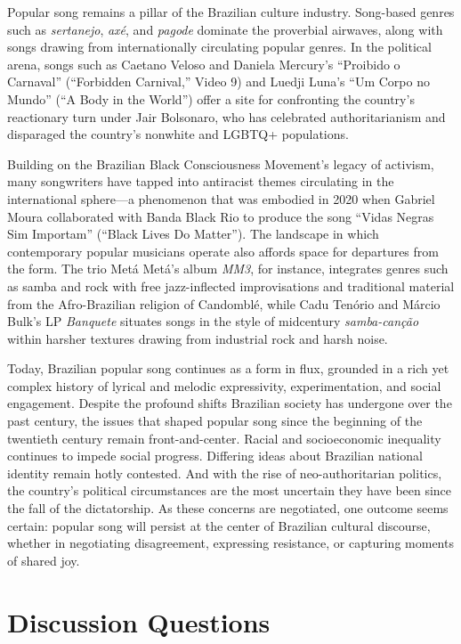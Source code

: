 \documentclass[twoside]{article}
\begin{document}
Popular song remains a pillar of the Brazilian culture industry.
Song-based genres such as \emph{sertanejo}, \emph{axé}, and
\emph{pagode} dominate the proverbial airwaves, along with songs drawing
from internationally circulating popular genres. In the political arena,
songs such as Caetano Veloso and Daniela Mercury's ``Proibido o
Carnaval'' (``Forbidden Carnival,'' Video 9) and Luedji Luna's ``Um
Corpo no Mundo'' (``A Body in the World'') offer a site for confronting
the country's reactionary turn under Jair Bolsonaro, who has celebrated
authoritarianism and disparaged the country's nonwhite and LGBTQ+
populations.

Building on the Brazilian Black Consciousness Movement's legacy of
activism, many songwriters have tapped into antiracist themes
circulating in the international sphere---a phenomenon that was embodied
in 2020 when Gabriel Moura collaborated with Banda Black Rio to produce
the song ``Vidas Negras Sim Importam'' (``Black Lives Do Matter''). The
landscape in which contemporary popular musicians operate also affords
space for departures from the form. The trio Metá Metá's album
\emph{MM3}, for instance, integrates genres such as samba and rock with
free jazz-inflected improvisations and traditional material from the
Afro-Brazilian religion of Candomblé, while Cadu Tenório and Márcio
Bulk's LP \emph{Banquete} situates songs in the style of midcentury
\emph{samba-canção} within harsher textures drawing from industrial rock
and harsh noise.

Today, Brazilian popular song continues as a form in flux, grounded in a
rich yet complex history of lyrical and melodic expressivity,
experimentation, and social engagement. Despite the profound shifts
Brazilian society has undergone over the past century, the issues that
shaped popular song since the beginning of the twentieth century remain
front-and-center. Racial and socioeconomic inequality continues to
impede social progress. Differing ideas about Brazilian national
identity remain hotly contested. And with the rise of neo-authoritarian
politics, the country's political circumstances are the most uncertain
they have been since the fall of the dictatorship. As these concerns are
negotiated, one outcome seems certain: popular song will persist at the
center of Brazilian cultural discourse, whether in negotiating
disagreement, expressing resistance, or capturing moments of shared joy.



\hypertarget{discussion-questions}{%
\section*{Discussion Questions}\label{discussion-questions}}
\end{document}
